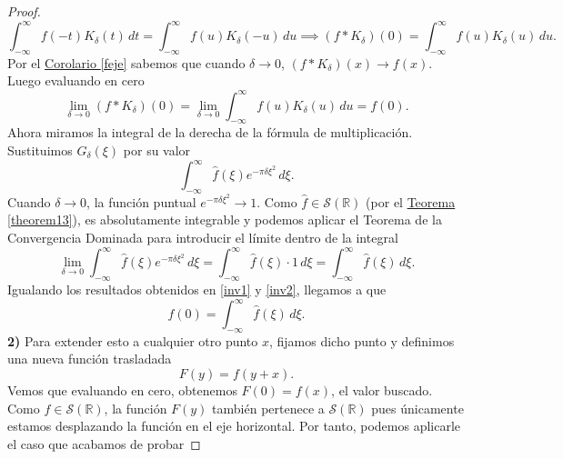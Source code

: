 \documentclass[12pt]{article}
\newcommand{\Sc}{\mathcal{S}(\mathbb{R})}
\theoremstyle{plain}
\theoremstyle{definition}
\numberwithin{equation}{section}
\begin{document}
\begin{proof}
\begin{equation*}
                    \int_{-\infty}^{\infty} f(-t)K_\delta(t) \,dt = \int_{-\infty}^{\infty} f(u)K_\delta(-u) \,du \implies (f * K_\delta)(0) = \int_{-\infty}^{\infty} f(u)K_\delta(u) \,du.
                \end{equation*}
                Por el \hyperref[feje]{Corolario \ref*{feje}} sabemos que cuando \(\delta \to 0\), \((f * K_\delta)(x) \to f(x)\). Luego evaluando en cero
                \begin{equation}
                    \label{inv1}
                    \lim_{\delta \to 0} (f * K_\delta)(0) = \lim_{\delta \to 0} \int_{-\infty}^{\infty} f(u)K_\delta(u) \,du = f(0).
                \end{equation}
                Ahora miramos la integral de la derecha de la fórmula de multiplicación. Sustituimos \(G_\delta(\xi)\) por su valor
                \begin{equation*}
                    \int_{-\infty}^{\infty} \hat{f}(\xi)e^{-\pi\delta\xi^2} \,d\xi.
                \end{equation*}
                Cuando \(\delta \to 0\), la función puntual \(e^{-\pi\delta\xi^2} \to 1\). Como \(\hat{f} \in \Sc\) (por el \hyperref[theorem13]{Teorema \ref*{theorem13}}), es absolutamente integrable y podemos aplicar el Teorema de la Convergencia Dominada para introducir el límite dentro de la integral
                \begin{equation}
                    \label{inv2}
                    \lim_{\delta \to 0} \int_{-\infty}^{\infty} \hat{f}(\xi)e^{-\pi\delta\xi^2} \,d\xi = \int_{-\infty}^{\infty} \hat{f}(\xi) \cdot 1 \,d\xi = \int_{-\infty}^{\infty} \hat{f}(\xi) \,d\xi.
                \end{equation}
                Igualando los resultados obtenidos en \eqref{inv1} y \eqref{inv2}, llegamos a que
                \begin{equation*}
                    f(0) = \int_{-\infty}^{\infty} \hat{f}(\xi) \,d\xi.
                \end{equation*}
                \textbf{2)} Para extender esto a cualquier otro punto \(x\), fijamos dicho punto y definimos una nueva función trasladada
                \begin{equation*}
                    F(y) = f(y+x).
                \end{equation*}
                Vemos que evaluando en cero, obtenemos \(F(0) = f(x)\), el valor buscado. Como \(f \in \Sc\), la función \(F(y)\) también pertenece a \(\Sc\) pues únicamente estamos desplazando la función en el eje horizontal. Por tanto, podemos aplicarle el caso que acabamos de probar

\end{proof}
\end{document}
